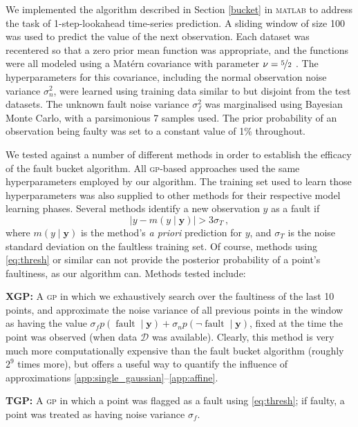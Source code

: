 \documentclass{article} %
\newcommand{\given}{\!\ensuremath{\mid}\!}
\newcommand{\cm}[1]{\ensuremath{\mathcal{#1}}}
\newcommand{\bm}[1]{\ensuremath{\mathbf{#1}}}
\newcommand{\data}{\ensuremath{\cm{D}}}
\newcommand{\acro}[1]{\textsc{\MakeLowercase{#1}}}
\newcommand{\vect}[1]{\bm{#1}}
\newcommand{\vy}{\vect{y}}
\newcommand{\p}[2]{p(#1\given#2)}
\newcommand{\mean}[2]{{m}(#1\given#2)}
\DeclareMathOperator{\fault}{fault}
\begin{document}
We implemented the algorithm described in Section \ref{bucket} in
\textsc{matlab} to address the task of 1-step-lookahead time-series
prediction.  A sliding window of size 100 was used to predict the
value of the next observation.  Each dataset was recentered so that a
zero prior mean function was appropriate, and the functions were all
modeled using a Mat\'{e}rn covariance with parameter $\nu =
\nicefrac{5}{2}$ \citep{gpml}.  The hyperparameters for this
covariance, including the normal observation noise variance
$\sigma_n^2$, were learned using training data similar to but disjoint from the test datasets.  The unknown fault noise variance $\sigma_f^2$
was marginalised using Bayesian Monte Carlo, with a parsimonious 7 samples used.  The prior probability of an observation being faulty was
set to a constant value of 1\% throughout.

We tested against a number of different methods in order to establish the efficacy of the fault bucket algorithm. All \acro{gp}-based approaches used the same hyperparameters employed by our algorithm. The training set used to learn those hyperparameters was also supplied to other methods for their respective model learning phases. Several methods identify a new observation $y$ as a fault if
\begin{equation}\label{eq:thresh}
 \bigl\lvert y-\mean{y}{\vy} \bigr\rvert > 3\sigma_T\,,
\end{equation}
where $\mean{y}{\vy}$ is the method's \emph{a priori} prediction for $y$, and $\sigma_T$ is the noise standard deviation on the faultless training set. Of course, methods using \eqref{eq:thresh} or similar can not provide the posterior probability of a point's faultiness, as our algorithm can. Methods tested include:

{\bf XGP:}
A  \acro{gp} in which we exhaustively search over the faultiness of the last 10 points, and approximate the noise variance of all previous points in the window as having the value $\sigma_f \p{\fault}{\vy} + \sigma_n \p{\neg\fault}{\vy}$, fixed at the time the point was observed (when data $\data$ was available). Clearly, this method is very much more computationally expensive than the fault bucket algorithm (roughly $2^9$ times more), but offers a useful way to quantify the influence of approximations \ref{app:single_gaussian}--\ref{app:affine}.

{\bf TGP:}
A \acro{gp} in which a point was flagged as a fault using \eqref{eq:thresh}; if faulty, a point was treated as having noise variance $\sigma_f$.
\end{document}
